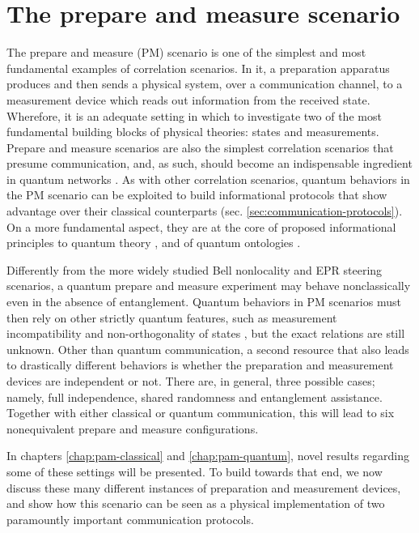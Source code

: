 \chapter{The prepare and measure scenario}
\label{chap:pam}

    The prepare and measure (PM) scenario is one of the simplest and most fundamental examples of correlation scenarios. In it, a preparation apparatus produces and then sends a physical system, over a communication channel, to a measurement device which reads out information from the received state. Wherefore, it is an adequate setting in which to investigate two of the most fundamental building blocks of physical theories: states and measurements. Prepare and measure scenarios are also the simplest correlation scenarios that presume communication, and, as such, should become an indispensable ingredient in quantum networks \cite{bowles_pamnetworks_2015,poderini_pamcriteria_2020}. As with other correlation scenarios, quantum behaviors in the PM scenario can be exploited to build informational protocols that show advantage over their classical counterparts (sec. \ref{sec:communication-protocols}). On a more fundamental aspect, they are at the core of proposed informational principles to quantum theory \cite{pawlowski_infocausality_2009,pawlowski_infocausalityreview_2011}, and of quantum ontologies \cite{spekkens_2005_contextuality}.

    Differently from the more widely studied Bell nonlocality and EPR steering scenarios, a quantum prepare and measure experiment may behave nonclassically even in the absence of entanglement. Quantum behaviors in PM scenarios must then rely on other strictly quantum features, such as measurement incompatibility \cite{carmeli_racsincompatibility_2020} and non-orthogonality of states \cite{brunner_dimension_2013}, but the exact relations are still unknown. Other than quantum communication, a second resource that also leads to drastically different behaviors is whether the preparation and measurement devices are independent or not. There are, in general, three possible cases; namely, full independence, shared randomness and entanglement assistance. Together with either classical or quantum communication, this will lead to six nonequivalent prepare and measure configurations.

    In chapters \ref{chap:pam-classical} and \ref{chap:pam-quantum}, novel results regarding some of these settings will be presented. To build towards that end, we now discuss these many different instances of preparation and measurement devices, and show how this scenario can be seen as a physical implementation of two paramountly important communication protocols.

